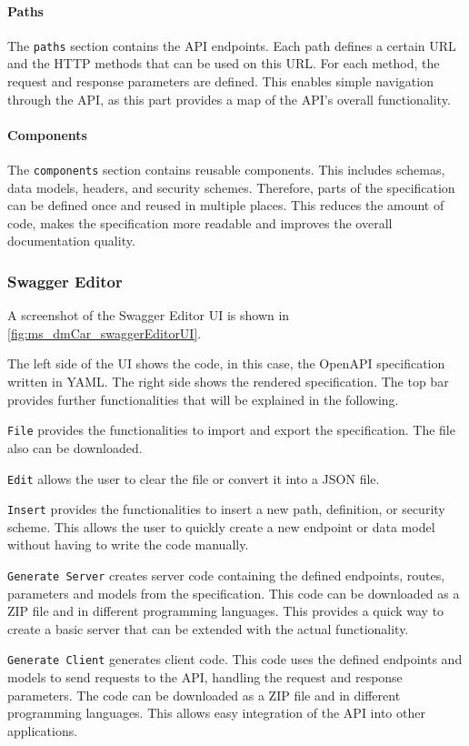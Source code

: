 \paragraph*{Paths}
The \texttt{paths} section contains the API endpoints.
Each path defines a certain URL and the HTTP methods that can be used on this URL.
For each method, the request and response parameters are defined.
This enables simple navigation through the API, as this part provides a map of the API's overall functionality.

\paragraph*{Components}
The \texttt{components} section contains reusable components.
This includes schemas, data models, headers, and security schemes.
Therefore, parts of the specification can be defined once and reused in multiple places.
This reduces the amount of code, makes the specification more readable and improves the overall documentation quality.

\subsubsection*{Swagger Editor}
A screenshot of the Swagger Editor UI is shown in \autoref{fig:ms_dmCar_swaggerEditorUI}.

The left side of the UI shows the code, in this case, the OpenAPI specification written in YAML.
The right side shows the rendered specification.
The top bar provides further functionalities that will be explained in the following.

\texttt{File} provides the functionalities to import and export the specification.
The file also can be downloaded.

\texttt{Edit} allows the user to clear the file or convert it into a JSON file.

\texttt{Insert} provides the functionalities to insert a new path, definition, or security scheme.
This allows the user to quickly create a new endpoint or data model without having to write the code manually.

\texttt{Generate Server} creates server code containing the defined endpoints, routes, parameters and models from the specification.
This code can be downloaded as a ZIP file and in different programming languages.
This provides a quick way to create a basic server that can be extended with the actual functionality.

\texttt{Generate Client} generates client code.
This code uses the defined endpoints and models to send requests to the API, handling the request and response parameters.
The code can be downloaded as a ZIP file and in different programming languages.
This allows easy integration of the API into other applications.

